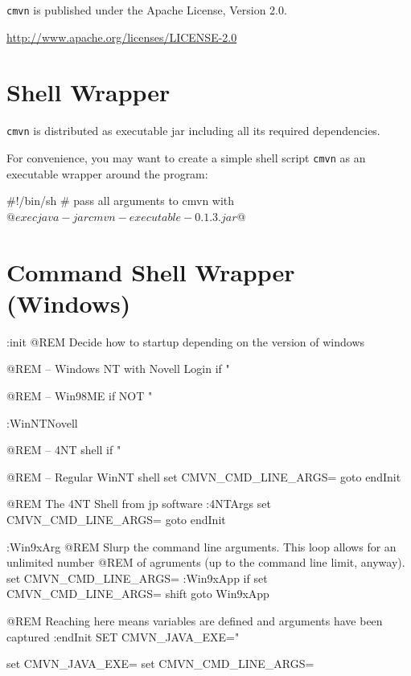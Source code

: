\documentclass[a4paper,12pt,english,oneside,halfparskip]{scrartcl}
\newcommand{\CMVN}{\texttt{cmvn}}
\newcommand{\cmvn}{\texttt{cmvn}}
\newcommand{\code}[1]{\texttt{#1}}
\begin{document}
\CMVN{} is published under the Apache License, Version 2.0.

\url{http://www.apache.org/licenses/LICENSE-2.0}

\clearpage
\appendix

\section{Shell Wrapper}

\cmvn{} is distributed as executable jar including all its required dependencies. 

For convenience, you may want to create a simple shell script \code{cmvn} as an executable wrapper around the program:

\begin{Cmdline}[caption={Shell wrapper: \code{mvu}}]
#!/bin/sh
# pass all arguments to cmvn with $@
exec java -jar cmvn-executable-0.1.3.jar $@
\end{Cmdline}

\section{Command Shell Wrapper (Windows)}

\begin{Cmdline}[caption={Windows Command Shell wrapper: \code{cmvn.bat}}]
:init
@REM Decide how to startup depending on the version of windows

@REM -- Windows NT with Novell Login
if "%

@REM -- Win98ME
if NOT "%

:WinNTNovell

@REM -- 4NT shell
if "%

@REM -- Regular WinNT shell
set CMVN_CMD_LINE_ARGS=%
goto endInit

@REM The 4NT Shell from jp software
:4NTArgs
set CMVN_CMD_LINE_ARGS=%
goto endInit

:Win9xArg
@REM Slurp the command line arguments.  This loop allows for an unlimited number
@REM of agruments (up to the command line limit, anyway).
set CMVN_CMD_LINE_ARGS=
:Win9xApp
if %
set CMVN_CMD_LINE_ARGS=%
shift
goto Win9xApp

@REM Reaching here means variables are defined and arguments have been captured
:endInit
SET CMVN_JAVA_EXE="%


set CMVN_JAVA_EXE=
set CMVN_CMD_LINE_ARGS=
\end{Cmdline}
\end{document}
